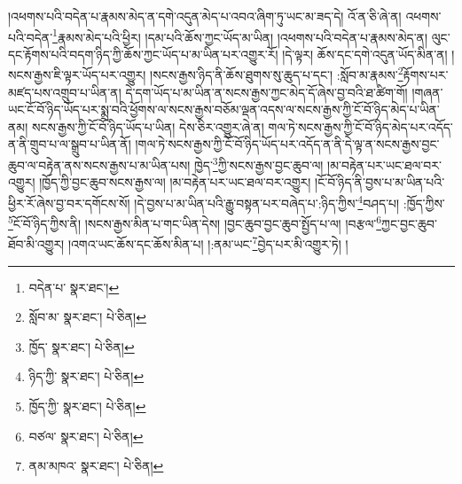 །འཕགས་པའི་བདེན་པ་རྣམས་མེད་ན་དགེ་འདུན་མེད་པ་འབའ་ཞིག་ཏུ་ཡང་མ་ཟད་དེ། འོ་ན་ཅི་ཞེ་ན། འཕགས་པའི་བདེན་\footnote{བདེན་པ་  སྣར་ཐང་། }རྣམས་མེད་པའི་ཕྱིར། །དམ་པའི་ཆོས་ཀྱང་ཡོད་མ་ཡིན། །འཕགས་པའི་བདེན་པ་རྣམས་མེད་ན། ལུང་དང་རྟོགས་པའི་བདག་ཉིད་ཀྱི་ཆོས་ཀྱང་ཡོད་པ་མ་ཡིན་པར་འགྱུར་རོ། །དེ་ལྟར། ཆོས་དང་དགེ་འདུན་ཡོད་མིན་ན། །སངས་རྒྱས་ཇི་ལྟར་ཡོད་པར་འགྱུར། །སངས་རྒྱས་ཉིད་ནི་ཆོས་ཐུགས་སུ་ཆུད་པ་དང་། :སློབ་མ་རྣམས་\footnote{སློབ་མ་  སྣར་ཐང་།  པེ་ཅིན། }རྟོགས་པར་མཛད་པས་འགྲུབ་པ་ཡིན་ན། དེ་དག་ཡོད་པ་མ་ཡིན་ན་སངས་རྒྱས་ཀྱང་མེད་དོ་ཞེས་བྱ་བའི་ཐ་ཚིག་གོ། །གཞན་ཡང་ངོ་བོ་ཉིད་ཡོད་པར་སྨྲ་བའི་ཕྱོགས་ལ་སངས་རྒྱས་བཅོམ་ལྡན་འདས་ལ་སངས་རྒྱས་ཀྱི་ངོ་བོ་ཉིད་མེད་པ་ཡིན་ནམ། སངས་རྒྱས་ཀྱི་ངོ་བོ་ཉིད་ཡོད་པ་ཡིན། དེས་ཅིར་འགྱུར་ཞེ་ན། གལ་ཏེ་སངས་རྒྱས་ཀྱི་ངོ་བོ་ཉིད་མེད་པར་འདོད་ན་ནི་གྲུབ་པ་ལ་སྒྲུབ་པ་ཡིན་ནོ། །གལ་ཏེ་སངས་རྒྱས་ཀྱི་ངོ་བོ་ཉིད་ཡོད་པར་འདོད་ན་ནི་དེ་ལྟ་ན་སངས་རྒྱས་བྱང་ཆུབ་ལ་བརྟེན་ནས་སངས་རྒྱས་པ་མ་ཡིན་པས། ཁྱེད་\footnote{ཁྱོད་  སྣར་ཐང་།  པེ་ཅིན། }ཀྱི་སངས་རྒྱས་བྱང་ཆུབ་ལ། །མ་བརྟེན་པར་ཡང་ཐལ་བར་འགྱུར། །ཁྱོད་ཀྱི་བྱང་ཆུབ་སངས་རྒྱས་ལ། །མ་བརྟེན་པར་ཡང་ཐལ་བར་འགྱུར། །ངོ་བོ་ཉིད་ནི་བྱས་པ་མ་ཡིན་པའི་ཕྱིར་རོ་ཞེས་བྱ་བར་དགོངས་སོ། །དེ་བྱས་པ་མ་ཡིན་པའི་རྒྱུ་བསྟན་པར་བཞེད་པ་:ཉིད་ཀྱིས་\footnote{ཉིད་ཀྱི་  སྣར་ཐང་།  པེ་ཅིན། }བཤད་པ། :ཁྱོད་ཀྱིས་\footnote{ཁྱོད་ཀྱི་  སྣར་ཐང་།  པེ་ཅིན། }ངོ་བོ་ཉིད་ཀྱིས་ནི། །སངས་རྒྱས་མིན་པ་གང་ཡིན་དེས། །བྱང་ཆུབ་བྱང་ཆུབ་སྤྱོད་པ་ལ། །བརྩལ་\footnote{བཙལ་  སྣར་ཐང་།  པེ་ཅིན། }ཀྱང་བྱང་ཆུབ་ཐོབ་མི་འགྱུར། །འགའ་ཡང་ཆོས་དང་ཆོས་མིན་པ། །:ནམ་ཡང་\footnote{ནམ་མཁའ་  སྣར་ཐང་།  པེ་ཅིན། }བྱེད་པར་མི་འགྱུར་ཏེ། །
